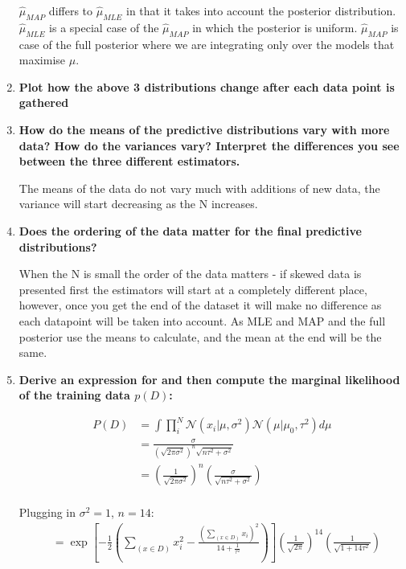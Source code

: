\documentclass[submit]{harvardml}
\begin{document}
\begin{enumerate}
    $\hat{\mu}_{MAP}$ differs to $\hat{\mu}_{MLE}$ in that it takes into account the posterior distribution. $\hat{\mu}_{MLE}$ is a special case of the $\hat{\mu}_{MAP}$ in which the posterior is uniform. $\hat{\mu}_{MAP}$ is case of the full posterior where we are integrating only over the models that maximise $\mu$.
    
    \item \textbf{Plot how the above 3 distributions change after each data point is gathered}
    \item \textbf{How do the means of the predictive distributions vary with more data?  How do the variances vary?  Interpret the differences you see between the three different estimators.}
    
    The means of the data do not vary much with additions of new data, the variance will start decreasing as the N increases. 
    
    \item \textbf{Does the ordering of the data matter for the final predictive
  distributions?}
    
    When the N is small the order of the data matters - if skewed data is presented first the estimators will start at a completely different place, however, once you get the end of the dataset it will make no difference as each datapoint will be taken into account. As MLE and MAP and the full posterior use the means to calculate, and the mean at the end will be the same.
  
    \item \textbf{Derive an expression for and then compute the marginal likelihood of the training data $p(D)$: }
    
    \begin{align*}
        P(D) &= \int \prod_i^N  \mathcal{N} (x_i|\mu , \sigma^2) \mathcal{N} (\mu | \mu_0, \tau^2) d\mu \\
        &= \frac{\sigma}{(\sqrt{2\pi \sigma^2})^n \sqrt{n\tau^2 + \sigma^2}} \\
        &= \left(\frac{1}{\sqrt{2\pi \sigma^2}}\right)^n \left(\frac{\sigma}{\sqrt{n\tau^2 + \sigma^2}} \right) \\
    \end{align*}
    
    Plugging in $\sigma^2 = 1$, $n = 14$:
    \begin{align*}
        &= \exp \left[-\frac{1}{2} \left( \sum_{(x \in D)} x_i^2 - \frac{(\sum_{(x \in D)} x_i)^2}{14 + \frac{1}{\tau^2}} \right) \right] \left(\frac{1}{\sqrt{2\pi}}\right)^{14} \left(\frac{1}{\sqrt{1 + 14\tau^2}} \right)
    \end{align*}
    

\end{enumerate}
\end{document}
